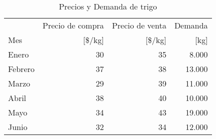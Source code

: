 \begin{table}[H]
\centering
\begin{tabular}{lrrr}
\hline
		& Precio de compra	& Precio de venta	& Demanda	\\
Mes		& [\$/kg]		& [\$/kg]		& [kg] 		\\ \hline
Enero		& 30			& 35			& 8.000		\\
Febrero		& 37			& 38			& 13.000	\\
Marzo		& 29			& 39			& 11.000	\\
Abril		& 38			& 40			& 10.000	\\
Mayo		& 34			& 43			& 19.000	\\
Junio		& 32			& 34			& 12.000	\\
 \hline
\end{tabular}
\caption{Precios y Demanda de trigo}
\label{tabla:5}
\end{table}

